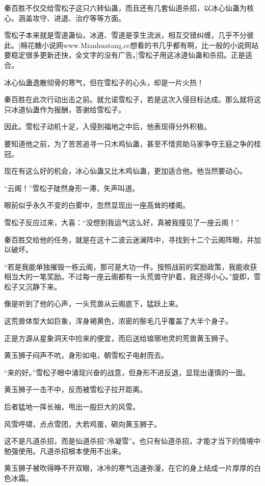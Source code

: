 \begin{this_body}
秦百胜不仅交给雪松子这只六转仙蛊，而且还有几套仙道杀招，以冰心仙蛊为核心。涵盖攻守、进退、治疗等等方面。

雪松子本来就是雪道蛊仙，冰道、雪道是孪生流派，相互交错纠缠，几乎不分彼此。[棉花糖小说网www.Mianhuatang.cc想看的书几乎都有啊，比一般的小说网站要稳定很多更新还快，全文字的没有广告。]雪松子用这冰道仙蛊和杀招。正是适合。

冰心仙蛊逸散彻骨的寒气，但在雪松子的心头，却是一片火热！

秦百胜在此次行动出击之前。就允诺雪松子，若是这次入侵目标达成。那么就将这只冰道仙蛊作为报酬，答谢给雪松子。

因此。雪松子动机十足，入侵到福地之中后，他表现得分外积极。

要知道他之前，为了苦苦追寻一只木鸡仙蛊，甚至不惜资助马家争夺王庭之争的桂冠。

现在有这么好的机会，冰心仙蛊又比木鸡仙蛊，更加适合他。他当然要动心。

“云阁！”雪松子陡然身形一滞，失声叫道。

眼前似乎永久不变的白雾中，忽然显现出一座高耸的楼阁。

雪松子反应过来，大喜：“没想到我运气这么好，真被我撞见了一座云阁！”

秦百胜交给他的任务，就是在这十二波云迷澜阵中，寻找到十二个云阁阵眼，并加以破坏。

“若是我能单独摧毁一栋云阁，那可是大功一件。按照战前的奖励政策，我能收获相当大的一笔奖励。不过每一座云阁都有一头荒兽守护着，我还得小心。”旋即，雪松子又沉静下来。

像是听到了他的心声，一头荒兽从云阁底下，猛跃上来。

这荒兽体型大如巨象，浑身褐黄色，浓密的鬃毛几乎覆盖了大半个身子。

正是方源从星象洞天中捡来的便宜，而后送给琅琊地灵的荒兽黄玉狮子。

黄玉狮子闷声不吭，身形如电，朝雪松子电射而去。

“来的好。”雪松子眼中涌现兴奋的战意，但身形不进反退，显现出谨慎的一面。

黄玉狮子一击不中，反而被雪松子拉开距离。

后者猛地一挥长袖，甩出一股巨大的风雪。

风雪呼啸，点点雪团，大若鸡蛋，砸向黄玉狮子。

这不是凡道杀招，而是仙道杀招“冷凝雪”。也只有仙道杀招，才能才当下的情境中勉强使用。凡道杀招根本使用不出来。

黄玉狮子被吹得睁不开双眼，冰冷的寒气迅速弥漫，在它的身上结成一片厚厚的白色冰霜。


\end{this_body}
